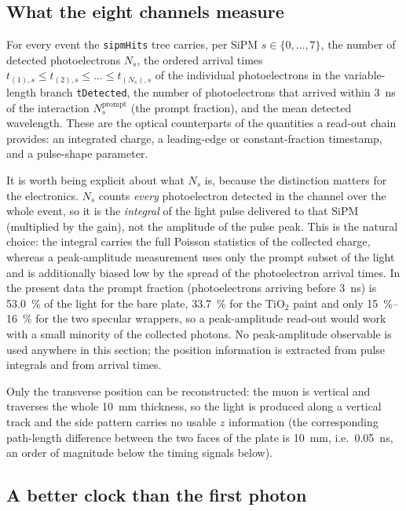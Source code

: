 \documentclass[11pt,a4paper]{article}
\begin{document}
\subsection{What the eight channels measure}
\label{sec:recon-method}

For every event the \texttt{sipmHits} tree carries, per SiPM $s \in \{0,\dots,7\}$,
the number of detected photoelectrons $N_s$, the ordered arrival times
$t_{(1),s} \le t_{(2),s} \le \dots \le t_{(N_s),s}$ of the individual
photoelectrons in the variable-length branch \texttt{tDetected}, the number of
photoelectrons that arrived within \SI{3}{\nano\second} of the interaction
$N^{\mathrm{prompt}}_s$ (the prompt fraction), and the mean detected
wavelength.  These are the optical counterparts of the quantities a read-out
chain provides: an integrated charge, a leading-edge or constant-fraction
timestamp, and a pulse-shape parameter.

It is worth being explicit about what $N_s$ is, because the distinction
matters for the electronics.  $N_s$ counts \emph{every} photoelectron detected
in the channel over the whole event, so it is the \emph{integral} of the light
pulse delivered to that SiPM (multiplied by the gain), not the amplitude of the
pulse peak.  This is the natural choice: the integral carries the full
Poisson statistics of the collected charge, whereas a peak-amplitude
measurement uses only the prompt subset of the light and is additionally
biased low by the spread of the photoelectron arrival times.  In the present
data the prompt fraction (photoelectrons arriving before \SI{3}{\nano\second})
is \SI{53.0}{\percent} of the light for the bare plate, \SI{33.7}{\percent} for
the TiO$_2$ paint and only \SIrange{15}{16}{\percent} for the two specular
wrappers, so a peak-amplitude read-out would work with a small minority of the
collected photons.  No peak-amplitude observable is used anywhere in this
section; the position information is extracted from pulse integrals and from
arrival times.

Only the transverse position can be reconstructed: the muon is vertical and
traverses the whole \SI{10}{\milli\meter} thickness, so the light is produced
along a vertical track and the side pattern carries no usable $z$ information
(the corresponding path-length difference between the two faces of the plate is
\SI{10}{\milli\meter}, i.e.\ \SI{0.05}{\nano\second}, an order of magnitude
below the timing signals below).

\subsection{A better clock than the first photon}
\label{sec:recon-cfd}
\end{document}
